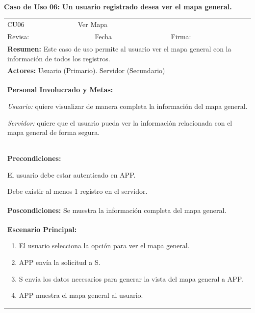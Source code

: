 		\textbf{Caso de Uso 06: Un usuario registrado desea ver el mapa general.}
			\begin{longtable}{|l|p{5.5cm}|l|p{2cm}|l|p{1.9cm}|} \hline
				\cellcolor{grisOscuro} CU06 & \multicolumn{4}{|l|}{  \cellcolor{grisOscuro} Ver Mapa} &  \cellcolor{grisClaro}\multirow{2}{1cm}{} \\ \cline{1-5}
				\cellcolor{grisOscuro} Revisa: &  \cellcolor{grisClaro} &  \cellcolor{grisOscuro} Fecha &  \cellcolor{grisClaro} &  \cellcolor{grisOscuro} Firma: & \cellcolor{grisClaro} \\ \hline
				\multicolumn{6}{|p{15cm}|}{ \textbf{Resumen: } Este caso de uso permite al usuario ver el mapa general con la información de todos los registros.

				} \\ \hline

				\multicolumn{6}{|p{15cm}|}{ \textbf{Actores: } Usuario (Primario). Servidor (Secundario)

				} \\ \hline

				\multicolumn{6}{|p{15cm}|}{ \textbf{Personal Involucrado y Metas: }
				
				\emph{Usuario:} quiere visualizar de manera completa la información del mapa general.

				\emph{Servidor:} quiere que el usuario pueda ver la información relacionada con el mapa general de forma segura.

				} \\ \hline

				\multicolumn{6}{|p{15cm}|}{ \textbf{Precondiciones: } 
				
				El usuario debe estar autenticado en APP.
				
				Debe existir al menos 1 registro en el servidor.

				} \\ \hline

				\multicolumn{6}{|p{15cm}|}{ \textbf{Poscondiciones: } Se muestra la información completa del mapa general.

				} \\ \hline

				\multicolumn{6}{|p{15cm}|}{ \textbf{Escenario Principal: }

				\begin{enumerate}
					\item El usuario selecciona la opción para ver el mapa general.
					\item APP envía la solicitud a S.
					\item S envía los datos necesarios para generar la vista del mapa general a APP.
					\item APP muestra el mapa general al usuario.
				\end{enumerate}

}
\end{longtable}
